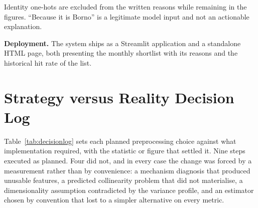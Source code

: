 \documentclass[conference]{IEEEtran}
\begin{document}
Identity one-hots are excluded from the written reasons while remaining in the
figures. ``Because it is Borno'' is a legitimate model input and not an
actionable explanation.

\textbf{Deployment.} The system ships as a Streamlit application and a
standalone HTML page, both presenting the monthly shortlist with its reasons
and the historical hit rate of the list.

\clearpage
\section{Strategy versus Reality Decision Log}
\label{sec:log}

Table~\ref{tab:decisionlog} sets each planned preprocessing choice against
what implementation required, with the statistic or figure that settled it.
Nine steps executed as planned. Four did not, and in every case the change was
forced by a measurement rather than by convenience: a mechanism diagnosis that
produced unusable features, a predicted collinearity problem that did not
materialise, a dimensionality assumption contradicted by the variance profile,
and an estimator chosen by convention that lost to a simpler alternative on
every metric.
\end{document}
